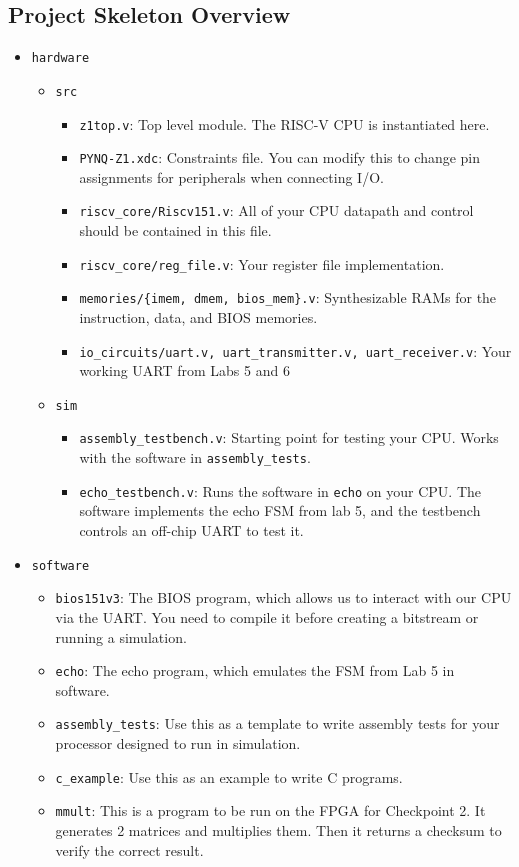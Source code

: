 \documentclass[11pt]{article}
\begin{document}
\subsection{Project Skeleton Overview}
\begin{itemize}
  \item \texttt{hardware}
    \begin{itemize}
      \item \texttt{src}
        \begin{itemize}
          \item \texttt{z1top.v}: Top level module. The RISC-V CPU is instantiated here.
          \item \texttt{PYNQ-Z1.xdc}: Constraints file. You can modify this to change pin assignments for peripherals when connecting I/O.
          \item \texttt{riscv\_core/Riscv151.v}: All of your CPU datapath and control should be contained in this file.
          \item \texttt{riscv\_core/reg\_file.v}: Your register file implementation.
          \item \verb|memories/{imem, dmem, bios_mem}.v|: Synthesizable RAMs for the instruction, data, and BIOS memories.
          \item \verb|io_circuits/uart.v, uart_transmitter.v, uart_receiver.v|: Your working UART from Labs 5 and 6
        \end{itemize}
      \item \texttt{sim}
        \begin{itemize}
          \item \verb|assembly_testbench.v|: Starting point for testing your CPU. Works with the software in \texttt{assembly\_tests}.
          \item \verb|echo_testbench.v|: Runs the software in \texttt{echo} on your CPU. The software implements the echo FSM from lab 5, and the testbench controls an off-chip UART to test it.
        \end{itemize}
    \end{itemize}
  \item \texttt{software}
    \begin{itemize}
      \item \verb|bios151v3|: The BIOS program, which allows us to interact with our CPU via the UART. You need to compile it before creating a bitstream or running a simulation.
      \item \verb|echo|: The echo program, which emulates the FSM from Lab 5 in software.
      \item \verb|assembly_tests|: Use this as a template to write assembly tests for your processor designed to run in simulation.
      \item \verb|c_example|: Use this as an example to write C programs.
      \item \verb|mmult|: This is a program to be run on the FPGA for Checkpoint 2. It generates 2 matrices and multiplies them. Then it returns a checksum to verify the correct result.
    \end{itemize}
\end{itemize}
\end{document}
